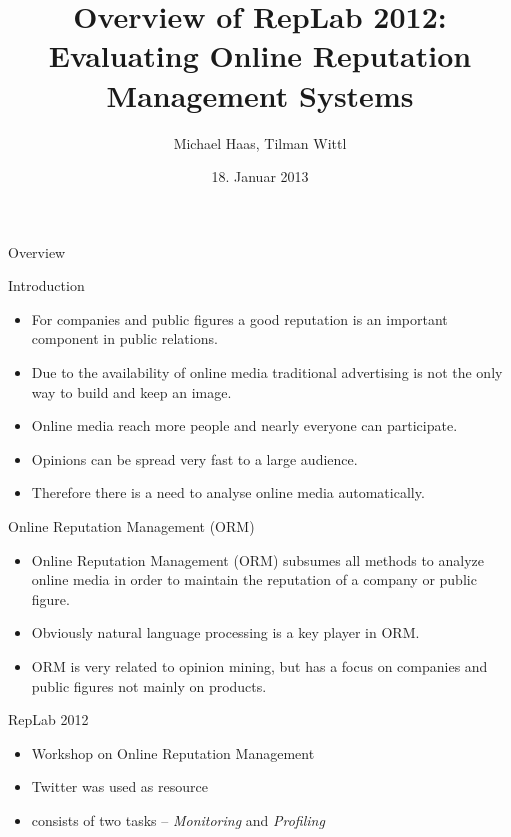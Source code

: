 \documentclass[12pt,a4paper]{beamer}
\author{Michael Haas, Tilman Wittl}
\title{Overview of RepLab 2012: Evaluating Online
Reputation Management Systems
}
\date{18. Januar 2013}
\begin{document}
\begin{frame}
\maketitle
\end{frame}

\begin{frame}{Overview}

\end{frame}

\begin{frame}{Introduction}
\begin{itemize}
\item For companies and public figures a good reputation is an important component in public relations.
\item Due to the availability of online media traditional advertising is not the only way to build and keep an image.
\item Online media reach more people and nearly everyone can participate.
\item Opinions can be spread very fast to a large audience.
\item Therefore there is a need to analyse online media automatically.
\end{itemize}
\end{frame}
\begin{frame}{Online Reputation Management (ORM)}
\begin{itemize}
\item Online Reputation Management (ORM) subsumes all methods to analyze online media in order to maintain the reputation of a company or public figure.
\item Obviously natural language processing is a key player in ORM.
\item ORM is very related to opinion mining, but has a focus on companies and public figures not mainly on products.
\end{itemize}
\end{frame}

\begin{frame}{RepLab 2012}
\begin{itemize}
\item Workshop on Online Reputation Management
\item Twitter was used as resource
\item consists of two tasks -- \textit{Monitoring} and \textit{Profiling}
\end{itemize}
\end{frame}
\end{document}
